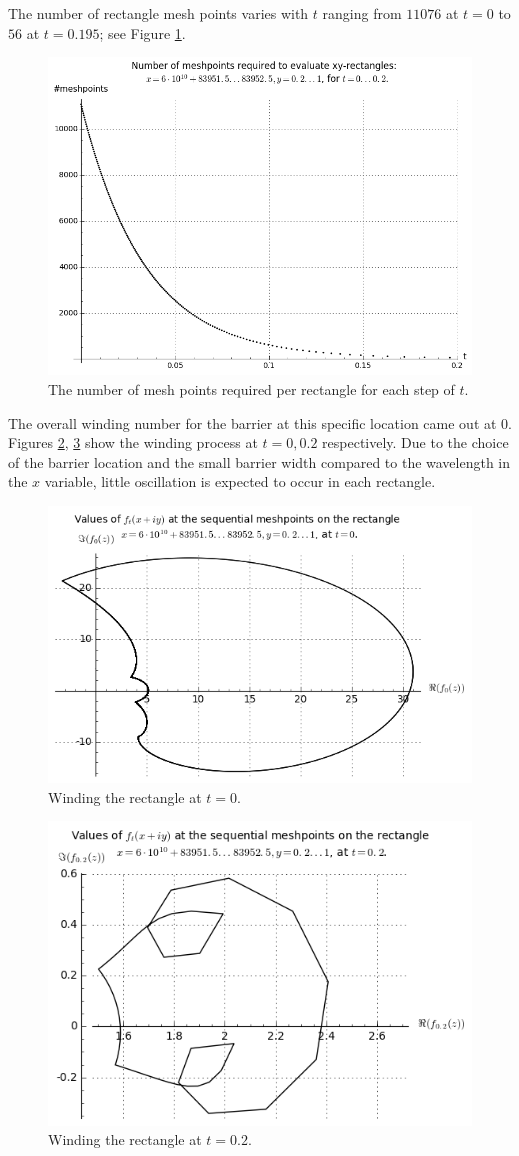 The number of rectangle mesh points varies with $t$ ranging from $11076$ at $t=0$ to $56$ at $t=0.195$; see Figure \ref{fig3}.

\begin{figure}[h!]
  \includegraphics[width=0.7\linewidth]{Numberofmeshpoints}
  \caption{The number of mesh points required per rectangle for each step of $t$.}\label{fig3}
\end{figure}

The overall winding number for the barrier at this specific location came out at $0$. Figures \ref{fig4}, \ref{fig4a} show the winding process at $t=0, 0.2$ respectively. Due to the choice of the barrier location and the small barrier width compared to the wavelength in the $x$ variable, little oscillation is expected to occur in each rectangle.

\begin{figure}[h!]
  \includegraphics[width=0.7\linewidth]{Windingprocess}
  \caption{Winding the rectangle at $t=0$.}\label{fig4}
\end{figure}

\begin{figure}[ht!]
  \includegraphics[width=0.7\linewidth]{Windingprocess_t02}
  \caption{Winding the rectangle at $t=0.2$.}\label{fig4a}
\end{figure}

